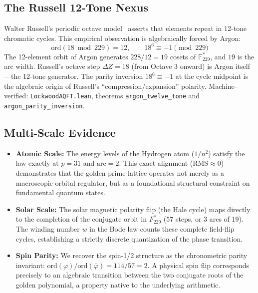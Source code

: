 \subsection{The Russell 12-Tone Nexus}

Walter Russell's periodic octave model~\cite{Russell1926} asserts that elements repeat in 12-tone chromatic cycles. This empirical observation is algebraically forced by Argon:
\begin{equation}
    \text{ord}(18 \bmod 229) = 12, \qquad 18^6 \equiv -1 \pmod{229}
\end{equation}
The 12-element orbit of Argon generates $228/12 = 19$ cosets of $\mathbb{F}_{229}^*$, and $19$ is the arc width. Russell's octave step $\Delta Z = 18$ (from Octave 3 onward) is Argon itself---the 12-tone generator. The parity inversion $18^6 \equiv -1$ at the cycle midpoint is the algebraic origin of Russell's ``compression/expansion'' polarity. Machine-verified: \texttt{LockwoodAQFT.lean}, theorems \texttt{argon\_twelve\_tone} and \texttt{argon\_parity\_inversion}.

\subsection{Multi-Scale Evidence}\label{sec:evidence}
\begin{itemize}
    \item \textbf{Atomic Scale:} The energy levels of the Hydrogen atom ($1/n^2$) satisfy the law exactly at $p=31$ and $\text{arc}=2$. This exact alignment ($\text{RMS} \approx 0$) demonstrates that the golden prime lattice operates not merely as a macroscopic orbital regulator, but as a foundational structural constraint on fundamental quantum states.
    \item \textbf{Solar Scale:} The solar magnetic polarity flip (the Hale cycle) maps directly to the completion of the conjugate orbit in $F_{229}^*$ ($57$ steps, or 3 arcs of 19). The winding number $w$ in the Bode law counts these complete field-flip cycles, establishing a strictly discrete quantization of the phase transition.
    \item \textbf{Spin Parity:} We recover the spin-1/2 structure as the chronometric parity invariant: $\text{ord}(\varphi)/\text{ord}(\bar{\varphi}) = 114/57 = 2$. A physical spin flip corresponds precisely to an algebraic transition between the two conjugate roots of the golden polynomial, a property native to the underlying arithmetic.
\end{itemize}

